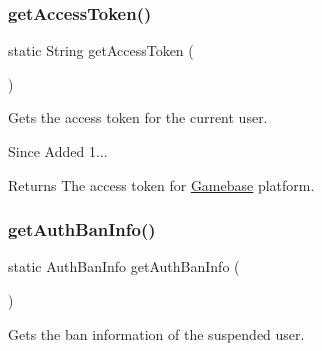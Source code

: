 \subsubsection{\texorpdfstring{get\+Access\+Token()}{getAccessToken()}}
{\footnotesize\ttfamily static String get\+Access\+Token (\begin{DoxyParamCaption}{ }\end{DoxyParamCaption})\hspace{0.3cm}{\ttfamily [static]}}



Gets the access token for the current user. 

\begin{DoxySince}{Since}
Added 1... 
\end{DoxySince}
\begin{DoxyReturn}{Returns}
The access token for \hyperlink{classcom_1_1toast_1_1android_1_1gamebase_1_1_gamebase}{Gamebase} platform. 
\end{DoxyReturn}
\mbox{\label{classcom_1_1toast_1_1android_1_1gamebase_1_1_gamebase_ad2da4e502aade3b2c9434fc1470e3425}} 
\subsubsection{\texorpdfstring{get\+Auth\+Ban\+Info()}{getAuthBanInfo()}}
{\footnotesize\ttfamily static Auth\+Ban\+Info get\+Auth\+Ban\+Info (\begin{DoxyParamCaption}{ }\end{DoxyParamCaption})\hspace{0.3cm}{\ttfamily [static]}}



Gets the ban information of the suspended user. 

